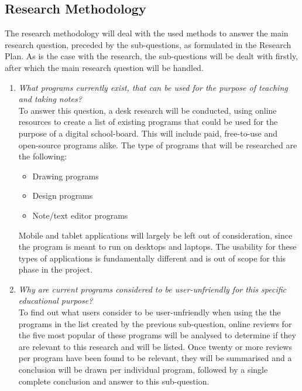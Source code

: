 \documentclass[a4paper,12pt]{article}
\begin{document}
\subsection{Research Methodology}

The research methodology will deal with the used methods to answer the main research question, preceded by the sub-questions, as formulated in the Research Plan. As is the case with the research, the sub-questions will be dealt with firstly, after which the main research question will be handled.

\begin{enumerate}
  
\item \textit{What programs currently exist, that can be used for the purpose of teaching and taking notes?}\\
  To answer this question, a desk research will be conducted, using online resources to create a list of existing programs that could be used for the purpose of a digital school-board. This will include paid, free-to-use and open-source programs alike. The type of programs that will be researched are the following:
  \begin{itemize}
  \item Drawing programs
  \item Design programs
  \item Note/text editor programs
  \end{itemize}

  Mobile and tablet applications will largely be left out of consideration, since the program is meant to run on desktops and laptops. The usability for these types of applications is fundamentally different and is out of scope for this phase in the project.
  
\item \textit{Why are current programs considered to be user-unfriendly for this specific educational purpose?}\\
  To find out what users consider to be user-unfriendly when using the the programs in the list created by the previous sub-question, online reviews for the five most popular of these programs will be analysed to determine if they are relevant to this research and will be listed. Once twenty or more reviews per program have been found to be relevant, they will be summarised and a conclusion will be drawn per individual program, followed by a single complete conclusion and answer to this sub-question.
  

\end{enumerate}
\end{document}
